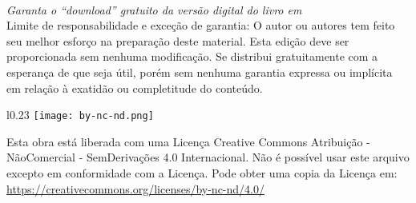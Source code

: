 ~\\

\noindent \textit{Garanta o ``download'' gratuito da versão digital do livro em \ImprimirLinkHomePageLivro}\\


\noindent Limite de responsabilidade e exceção de garantia: O autor ou autores tem feito
seu melhor esforço na preparação deste material.
Esta edição deve ser proporcionada sem nenhuma modificação. 
Se distribui gratuitamente com a esperança de que seja útil, 
porém sem nenhuma garantia expressa ou implícita em relação à exatidão ou completitude do conteúdo.


\vfill
\begin{wrapfigure}{l}{0.23\textwidth}
\texttt{[image: by-nc-nd.png]}
\end{wrapfigure}
\noindent Esta obra está liberada com uma Licença 
Creative Commons Atribuição - NãoComercial - SemDerivações 4.0 Internacional.
Não é possível usar este arquivo excepto em conformidade com a Licença. 
Pode obter uma copia da Licença em:
\url{https://creativecommons.org/licenses/by-nc-nd/4.0/}\\ %
